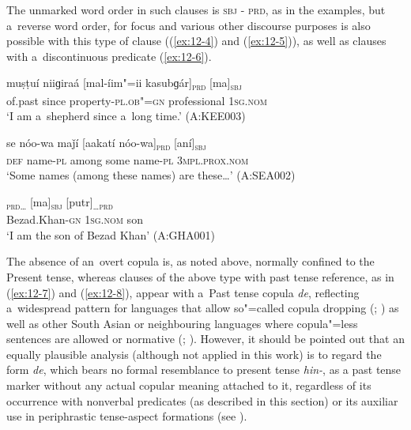 The unmarked word order in such clauses is \textsc{sbj - prd}, as in the examples, but a~reverse word order, for focus and various other discourse purposes is also possible with this type of clause ((\ref{ex:12-4}) and (\ref{ex:12-5})), as well as clauses with a~discontinuous predicate (\ref{ex:12-6}).

\begin{exe}
\ex
\label{ex:12-4}
\gll muṣṭuí niiɡiraá [mal-íim"=ii kasubɡár]\textsubscript{\textsc{prd}} [ma]\textsubscript{\textsc{sbj}} \\
of.past since property-\textsc{pl.ob"=gn} professional \textsc{1sg.nom}  \\
\glt `I am a~shepherd since a~long time.' (A:KEE003)
\end{exe}
\begin{exe}
\ex
\label{ex:12-5}
\gll se nóo-wa maǰí [aakatí nóo-wa]\textsubscript{\textsc{prd}} [aní]\textsubscript{\textsc{sbj}} \\
\textsc{def} name-\textsc{pl} among some name-\textsc{pl} 3\textsc{mpl.prox.nom} \\
\glt `Some names (among these names) are these{\ldots}' (A:SEA002)
\end{exe}
\begin{exe}
\ex
\label{ex:12-6}
\gll [beezaadxaan-íi]\textsubscript{\textsc{prd{\ldots}}} [ma]\textsubscript{\textsc{sbj}} [putr]\textsubscript{\textsc{{\ldots}prd}} \\
Bezad.Khan-\textsc{gn} \textsc{1sg.nom} son  \\
\glt `I am the son of Bezad Khan' (A:GHA001)
\end{exe}

The absence of an~overt copula is, as noted above, normally confined to the Present tense, whereas clauses of the above type with past tense reference, as in (\ref{ex:12-7}) and (\ref{ex:12-8}), appear with a~Past tense copula \textit{de}, reflecting a~widespread pattern for languages that allow so"=called copula dropping (\citealt[34]{pustet2003}; \citealt[120]{givon2001a}) as well as other South Asian or neighbouring languages where copula"=less sentences are allowed or normative (\citealt[339]{masica1991}; \citealt[121]{baart1999a}). However, it should be pointed out that an equally plausible analysis (although not applied in this work) is to regard the form \textit{de}, which bears no formal resemblance to present tense \textit{hin-}, as a past tense marker without any actual copular meaning attached to it, regardless of its occurrence with nonverbal predicates (as described in this section) or its auxiliar use in periphrastic tense-aspect formations (see ). 

